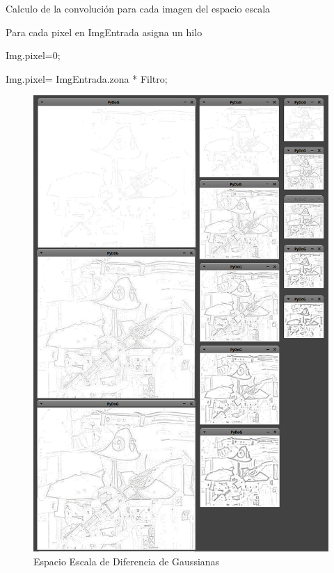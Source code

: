 \begin{algorithm}[H]
\caption{Calculo de la convolución para cada imagen del espacio escala}
 Para cada pixel en ImgEntrada asigna un hilo\;
 
 {
	{
		Img.pixel=0;
	}{
		
		Img.pixel= ImgEntrada.zona * Filtro; 
		\\
		}
 }
	

\end{algorithm}
\begin{figure}[ph]
			\centering
				\includegraphics[scale=0.45]{img/pyDoGT.jpg}
			\caption{Espacio Escala de Diferencia de Gaussianas}
\end{figure}


